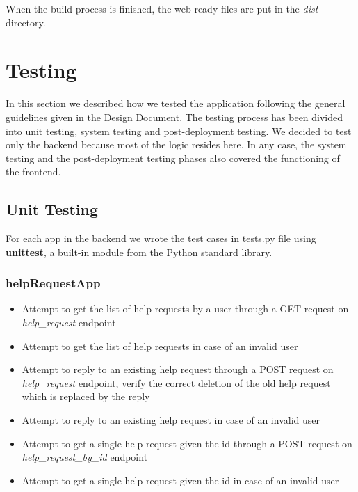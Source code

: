 \documentclass[table, 12pt]{article}
\begin{document}
When the build process is finished, the web-ready files are put in the \textit{dist} directory.

\newpage
\section{Testing}

In this section we described how we tested the application following the general guidelines given in the Design Document.
The testing process has been divided into unit testing, system testing and post-deployment testing.
We decided to test only the backend because most of the logic resides here.
In any case, the system testing and the post-deployment testing phases also covered the functioning of the frontend.

\subsection{Unit Testing}
For each app in the backend we wrote the test cases in tests.py file using \textbf{unittest}, a built-in module from the Python standard library.
\subsubsection*{helpRequestApp}
\begin{itemize}
    \item Attempt to get the list of help requests by a user through a GET request on \textit{help\_request} endpoint
    \item Attempt to get the list of help requests in case of an invalid user
    \item Attempt to reply to an existing help request through a POST request on \textit{help\_request} endpoint, verify the correct deletion of the old help request which is replaced by the reply
    \item Attempt to reply to an existing help request in case of an invalid user
    \item Attempt to get a single help request given the id through a POST request on \textit{help\_request\_by\_id} endpoint
    \item Attempt to get a single help request given the id in case of an invalid user
\end{itemize}
\end{document}
